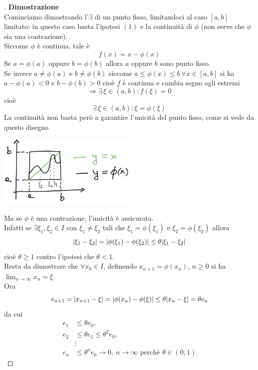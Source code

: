 \documentclass[12pt]{article}
\DeclarePairedDelimiter{\abs}{\lvert}{\rvert}
\begin{document}
\begin{proof}[\unskip\nopunct]
\textbf{Dimostrazione}\\
Cominciamo dimostrando l'$\exists$ di un punto fisso, limitandoci al caso $[a,b]$ limitato: in questo caso basta l'ipotesi $(1)$ e la continuità di $\phi$ (non serve che $\phi$ sia una contrazione). \\
Siccome $\phi$ è continua, tale è 
\[ f(x) = x - \phi(x) \]
Se $a = \phi(a)$ oppure $b = \phi(b)$ allora $a$ oppure $b$ sono punto fisso.\\
Se invece $a \neq \phi(a)$ e $b \neq \phi(b)$ siccome $a \leq \phi(x) \leq b \ \forall x \in [a,b]$ si ha $a - \phi(a) < 0$ e $b - \phi(b) > 0$ cioè $f$ è continua e cambia segno agli estremi 
\[\Longrightarrow \exists\, \xi \in (a,b):f(\xi)=0\] 
cioè \[\exists\, \xi \in (a,b) : \xi = \phi(\xi)\]
La continuità non basta però a garantire l'unicità del punto fisso, come si vede da questo disegno
\begin{center}
    \includegraphics[width=0.5\textwidth]{img1_pag7.png}
\end{center}
Ma se $\phi$ è una contrazione, l'unicità è assicurata. \\
Infatti se $\exists \xi_1, \xi_2 \in I$ con $\xi_1 \neq \xi_2$ tali che $\xi_1 = \phi(\xi_1)$ e $\xi_2 = \phi(\xi_2)$ allora 
\[\abs{\xi_1 - \xi_2} = \abs{\phi(\xi_1) - \phi(\xi_2)} \leq \theta\abs{\xi_1 - \xi_2}\] 
cioè $\theta \geq 1$ contro l'ipotesi che $\theta < 1$. \\
Resta da dimostrare che $\forall x_0 \in I$, definendo $x_{n+1} = \phi(x_n)$, $n \geq 0$ si ha $\lim_{n\to\infty} x_n = \xi$. \\
Ora 
\[e_{n+1} = \abs{x_{n+1} - \xi} = \abs{\phi(x_n) - \phi(\xi)} \leq \theta\abs{x_n - \xi} = \theta e_n\]
da cui 
\[\begin{split}
    e_1 & \leq \theta e_0,\\
    e_2 & \leq \theta e_1 \leq \theta^2 e_0, \\
    & \vdots \\
    e_n & \leq \theta^n e_0 \to 0, \ n\to\infty \text{ perchè } \theta \in (0,1)
\end{split}\]
\end{proof}
\end{document}
